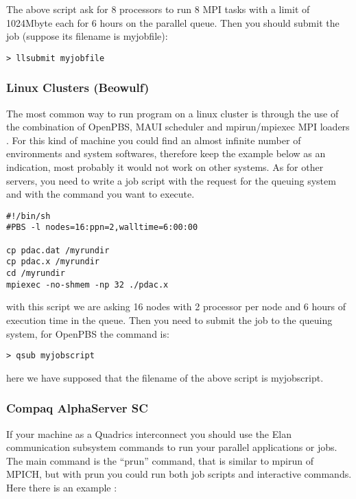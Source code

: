 The above script ask for 8 processors to run 8 MPI tasks
with a limit of 1024Mbyte each for 6 hours on the parallel queue.
Then you should submit the job (suppose its filename is myjobfile):

\begin{verbatim}
> llsubmit myjobfile
\end{verbatim}

\subsubsection{Linux Clusters (Beowulf)}

The most common way to run program on a linux cluster 
is through the use of the combination of OpenPBS, MAUI scheduler
and mpirun/mpiexec MPI loaders .
For this kind of machine you could find an almost infinite number
of environments and system softwares, therefore keep the example below
as an indication, most probably it would not work on other systems. 
As for other servers, you need to write a job script with
the request for the queuing system and with the command you 
want to execute.

\begin{verbatim}
#!/bin/sh
#PBS -l nodes=16:ppn=2,walltime=6:00:00

cp pdac.dat /myrundir
cp pdac.x /myrundir
cd /myrundir
mpiexec -no-shmem -np 32 ./pdac.x
\end{verbatim}

with this script we are asking 16 nodes with 2 processor per node
and 6 hours of execution time in the queue. Then you need to
submit the job to the queuing system, for OpenPBS the command is:

\begin{verbatim}
> qsub myjobscript
\end{verbatim}

here we have supposed that the filename of the above script is
myjobscript.

\subsubsection{Compaq AlphaServer SC}

If your machine as a Quadrics interconnect you should use the 
Elan communication subsystem commands to run your parallel applications
or jobs. The main command is the ``prun'' command, that is similar
to mpirun of MPICH, but with prun you could run both job scripts
and interactive commands. Here there is an example :

